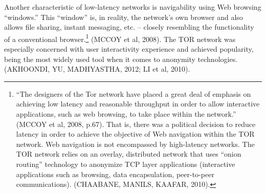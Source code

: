 Another characteristic of low-latency networks is navigability using Web browsing ``windows.'' This ``window'' is, in reality, the network's own browser and also allows file sharing, instant messaging, etc. -- closely resembling the functionality of a conventional browser.\footnote{``The designers of the Tor network have placed a great deal of emphasis on achieving low latency and reasonable throughput in order to allow interactive applications, such as web browsing, to take place within the network.'' (MCCOY et al, 2008, p.67). That is, there was a political decision to reduce latency in order to achieve the objective of Web navigation within the TOR network. Web navigation is not encompassed by high-latency networks. The TOR network relies on an overlay, distributed network that uses ``onion routing'' technology to anonymize TCP layer applications (interactive applications such as browsing, data encapsulation, peer-to-peer communications). (CHAABANE, MANILS, KAAFAR, 2010).} (MCCOY et al, 2008). The TOR network was especially concerned with user interactivity experience and achieved popularity, being the most widely used tool when it comes to anonymity technologies. (AKHOONDI, YU, MADHYASTHA, 2012; LI et al, 2010).

